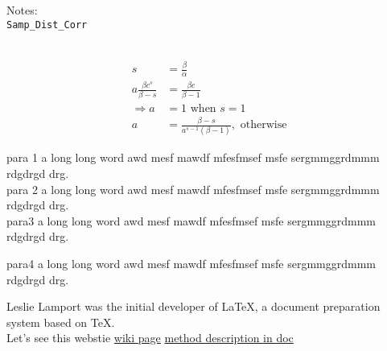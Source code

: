 \documentclass{article}
\begin{document}
Notes: \\
\texttt{Samp\_Dist\_Corr}\\

\\

\text{\#}

\begin{align*}
s &= \frac{\beta}{\alpha}\\
a\frac{\beta c^s}{\beta -s}&=\frac{\beta c}{\beta -1}\\
\Rightarrow 
 a &= 1 \text{ when } s=1 \\
a&=\frac{\beta - s}{a^{s-1}(\beta-1)}, \text{ otherwise}
\end{align*}

para 1 a long long word awd mesf mawdf mfesfmsef msfe sergmmggrdmmm rdgdrgd drg. \\

para 2  a long long word awd mesf mawdf mfesfmsef msfe sergmmggrdmmm rdgdrgd drg. \\
para3  a long long word awd mesf mawdf mfesfmsef msfe sergmmggrdmmm rdgdrgd drg. 
\par para4  a long long word awd mesf mawdf mfesfmsef msfe sergmmggrdmmm rdgdrgd drg. 


Leslie Lamport was the initial developer of \LaTeX, a document preparation system\cite{lam} based on \TeX.   \\
Let's see this webstie \href{https://en.wikibooks.org/wiki/LaTeX/Hyperlinks}{wiki page}
\href{https://networkx.github.io/documentation/networkx-1.11/reference/generated/networkx.algorithms.shortest_paths.generic.average_shortest_path_length.html?highlight=average%20shortest%20path%20length}{method description in doc}
\end{document}

